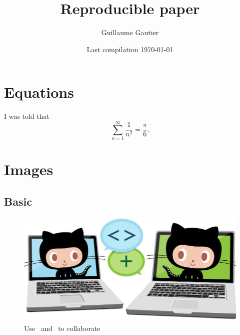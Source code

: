 \documentclass{article}
\begin{document}

\title{Reproducible paper}

\author{Guillaume Gautier}

\date{ Last compilation \today }

\maketitle




\section{Equations} %
\label{sec:equations}

	I was told that
	\begin{equation}
		\sum_{n=1}^{\infty} \frac{1}{n^2} = \frac{\pi}{6}.
	\end{equation}


\section{Images} %
\label{sec:images}

	\subsection{Basic} %
	\label{sub:basic}
		
		\begin{figure}[h]
			\label{fig:collabocats}
			\centering
			\includegraphics[scale=0.1]{images/collabocats.jpg}
			\caption{Use \href{https://git-scm.com/}{\textcolor{black}{\faGit}}\ and \href{https://github.com/}{\textcolor{black}{\faGithub}}\ to collaborate}
		\end{figure}
\end{document}
